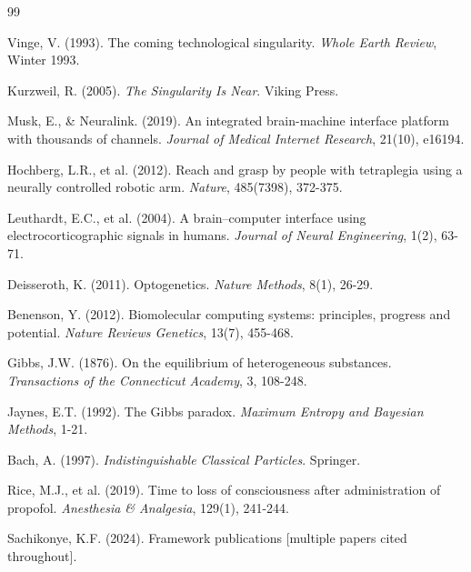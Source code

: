 \documentclass[11pt,a4paper]{article}
\theoremstyle{definition}
\theoremstyle{remark}
\begin{document}

\begin{thebibliography}{99}

Vinge, V. (1993). The coming technological singularity. \textit{Whole Earth Review}, Winter 1993.

Kurzweil, R. (2005). \textit{The Singularity Is Near}. Viking Press.

Musk, E., \& Neuralink. (2019). An integrated brain-machine interface platform with thousands of channels. \textit{Journal of Medical Internet Research}, 21(10), e16194.

Hochberg, L.R., et al. (2012). Reach and grasp by people with tetraplegia using a neurally controlled robotic arm. \textit{Nature}, 485(7398), 372-375.

Leuthardt, E.C., et al. (2004). A brain–computer interface using electrocorticographic signals in humans. \textit{Journal of Neural Engineering}, 1(2), 63-71.

Deisseroth, K. (2011). Optogenetics. \textit{Nature Methods}, 8(1), 26-29.

Benenson, Y. (2012). Biomolecular computing systems: principles, progress and potential. \textit{Nature Reviews Genetics}, 13(7), 455-468.

Gibbs, J.W. (1876). On the equilibrium of heterogeneous substances. \textit{Transactions of the Connecticut Academy}, 3, 108-248.

Jaynes, E.T. (1992). The Gibbs paradox. \textit{Maximum Entropy and Bayesian Methods}, 1-21.

Bach, A. (1997). \textit{Indistinguishable Classical Particles}. Springer.

Rice, M.J., et al. (2019). Time to loss of consciousness after administration of propofol. \textit{Anesthesia \& Analgesia}, 129(1), 241-244.

Sachikonye, K.F. (2024). Framework publications [multiple papers cited throughout].

\end{thebibliography}
\end{document}
